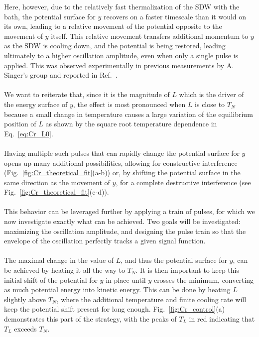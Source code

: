 Here, however, due to the relatively fast thermalization of the SDW with the bath, the potential surface for $y$ recovers on a faster timescale than it would on its own, leading to a relative movement of the potential opposite to the movement of $y$ itself.
This relative movement transfers additional momentum to $y$ as the SDW is cooling down, and the potential is being restored, leading ultimately to a higher oscillation amplitude, even when only a single pulse is applied.
This was observed experimentally in previous measurements by A. Singer's group and reported in Ref.~\cite{Singer2015prl}. 
\\\\
We want to reiterate that, since it is the magnitude of $L$ which is the driver of the energy surface of $y$, the effect is most pronounced when $L$ is close to $T_N$ because a small change in temperature causes a large variation of the equilibrium position of $L$ as shown by the square root temperature dependence in Eq.~\eqref{eq:Cr_L0}.    
\\\\
Having multiple such pulses that can rapidly change the potential surface for $y$ opens up many additional possibilities, allowing for constructive interference (Fig.~\ref{fig:Cr_theoretical_fit}(a-b)) or, by shifting the potential surface in the same direction as the movement of $y$, for a complete destructive interference (see Fig.~\ref{fig:Cr_theoretical_fit}(c-d)).
\\\\
This behavior can be leveraged further by applying a train of pulses, for which we now investigate exactly what can be achieved.
Two goals will be investigated: maximizing the oscillation amplitude, and designing the pulse train so that the envelope of the oscillation perfectly tracks a given signal function. 
\\\\
The maximal change in the value of $L$, and thus the potential surface for $y$, can be achieved by heating it all the way to $T_N$.
It is then important to keep this initial shift of the potential for $y$ in place until $y$ crosses the minimum, converting as much potential energy into kinetic energy.
This can be done by heating $L$ slightly above $T_N$, where the additional temperature and finite cooling rate will keep the potential shift present for long enough.
Fig.~\ref{fig:Cr_control}(a) demonstrates this part of the strategy, with the peaks of $T_L$ in red indicating that $T_L$ exceeds $T_N$.

